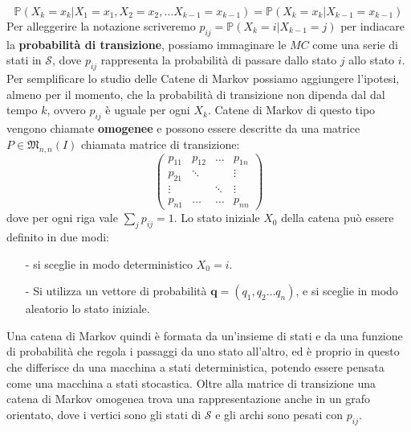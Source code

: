 \documentclass{article}
\theoremstyle{definition}
\theoremstyle{remark}
\begin{document}
    $$\mathbb{P}(X_k = x_k|X_1 = x_1, X_2=x_2,\dots X_{k-1}=x_{k-1})= \mathbb{P}(X_k=x_k| X_{k-1}=x_{k-1}) $$
Per alleggerire la notazione scriveremo $p_{ij}= \mathbb{P}(X_k=i|X_{k-1}=j)$ per indiacare la \textbf{probabilità di transizione},
possiamo immaginare le $MC$ come una serie di stati in $\mathcal{S}$, dove $p_{ij}$ rappresenta la probabilità di passare
dallo stato $j$ allo stato $i$.
Per semplificare lo studio delle Catene di Markov possiamo aggiungere l'ipotesi, almeno per il momento, che la probabilità di transizione non dipenda 
dal dal tempo $k$, ovvero $p_{ij}$ è uguale per ogni $X_k$. Catene di Markov di questo tipo vengono chiamate \textbf{omogenee} e possono essere
descritte da una matrice  $P\in\mathfrak{M}_{n,n}(I)$ chiamata matrice di transizione:
$$\begin{pmatrix}
    p_{11}&p_{12}&\dots &p_{1n}\\
    p_{21}&\ddots&&\vdots \\
    \vdots & &\ddots&\vdots\\
    p_{n1}&\dots &\dots& p_{nn} 
\end{pmatrix}$$
 dove per ogni riga vale $\sum_j p_{ij} = 1$. Lo stato iniziale $X_0$ della catena può essere definito in due modi:
 \begin{itemize}
    \item [-]si sceglie in modo deterministico $X_0 = i$.
    \item [-] Si utilizza un vettore di probabilità $\boldsymbol{q} = (q_1,q_2\dots q_n)$, e si sceglie in modo aleatorio lo stato iniziale.
 \end{itemize}
 Una catena di Markov quindi è formata da un'insieme di stati e da una funzione di probabilità che regola i passaggi da uno stato all'altro, ed è proprio in
 questo che differisce da una macchina a stati deterministica, potendo essere pensata come una macchina a stati stocastica.
 Oltre alla matrice di transizione una catena di Markov omogenea trova una rappresentazione anche in un grafo orientato, dove i vertici 
 sono gli stati di $\mathcal{S}$  e gli archi sono pesati con $p_{ij}$.
\end{document}
